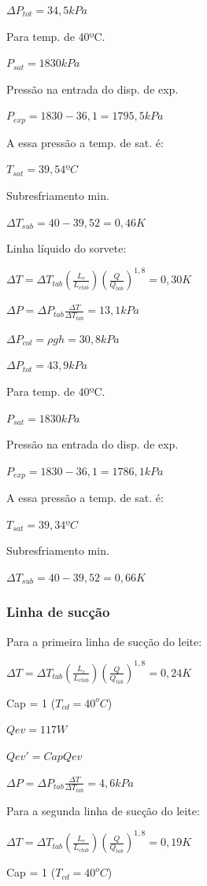 \documentclass[10pt,a4paper]{article}
\begin{document}
$\Delta P_{tot} = 34,5 kPa$

Para temp. de 40ºC.

$P_{sat} = 1830 kPa$

Pressão na entrada do disp. de exp.

$P_{exp} = 1830 - 36,1 = 1795,5 kPa$

A essa pressão a temp. de sat. é:

$T_{sat} = 39,54ºC$

Subresfriamento min.

$\Delta T_{sub} = 40 - 39,52 = 0,46K$

Linha líquido do sorvete:

$\Delta T = \Delta T_{tab} (\frac{L_e}{L_{etab}}) (\frac{Q}{Q_{tab}})^{1,8} = 0,30 K$

$\Delta P = \Delta P_{tab} \frac{\Delta T}{\Delta T_{tab}} = 13,1 kPa$

$\Delta P_{col} = \rho g h = 30,8 kPa$

$\Delta P_{tot} = 43,9 kPa$

Para temp. de 40ºC.

$P_{sat} = 1830 kPa$

Pressão na entrada do disp. de exp.

$P_{exp} = 1830 - 36,1 = 1786,1 kPa$

A essa pressão a temp. de sat. é:

$T_{sat} = 39,34ºC$

Subresfriamento min.

$\Delta T_{sub} = 40 - 39,52 = 0,66K$

\subsubsection{Linha de sucção}

Para a primeira linha de sucção do leite:

$\Delta T = \Delta T_{tab} (\frac{L_e}{L_{etab}}) (\frac{Q}{Q_{tab}})^{1,8} = 0,24 K$

Cap = 1 ($T_{cd} = 40^o C$)

$Qev =117 W $ 

$Qev' = Cap Qev$

$\Delta P = \Delta P_{tab} \frac{\Delta T}{\Delta T_{tab}} = 4,6 kPa$

Para a segunda linha de sucção do leite:

$\Delta T = \Delta T_{tab} (\frac{L_e}{L_{etab}}) (\frac{Q}{Q_{tab}})^{1,8} = 0,19 K$

Cap = 1 ($T_{cd} = 40^o C$)
\end{document}
